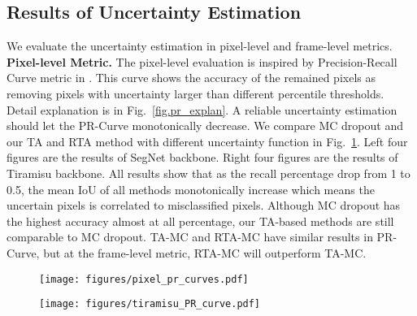 \subsection{Results of Uncertainty Estimation}



We evaluate the uncertainty estimation in pixel-level and frame-level metrics.\\
\noindent\textbf{Pixel-level Metric.}  The pixel-level evaluation is inspired by Precision-Recall Curve metric in \cite{kendall2017uncertainties}. This curve shows the accuracy of the remained pixels as removing pixels with uncertainty larger than different percentile thresholds. Detail explanation is in Fig.~\ref{fig.pr_explan}. A reliable uncertainty estimation should let the PR-Curve monotonically decrease. We compare MC dropout and our TA and RTA method with different uncertainty function in Fig.~\ref{fig.pr_curve}. Left four figures are the results of SegNet backbone. Right four figures are the results of Tiramisu backbone. All results show that as the recall percentage drop from 1 to 0.5, the mean IoU of all methods monotonically increase which means the uncertain pixels is correlated to misclassified pixels. Although MC dropout has the highest accuracy almost at all percentage, our TA-based methods are still comparable to MC dropout. TA-MC and RTA-MC have similar results in PR-Curve, but at the frame-level metric, RTA-MC will outperform TA-MC.\\






\begin{figure}[t]
\centering
\setlength\belowcaptionskip{-20pt}
\begin{minipage}{.5\textwidth}
  \centering
  \texttt{[image: figures/pixel\_pr\_curves.pdf]}
\end{minipage}\begin{minipage}{.5\textwidth}
  \centering
  \texttt{[image: figures/tiramisu\_PR\_curve.pdf]}
\end{minipage}
\small \caption{\small {}}
\label{fig.pr_curve}
\end{figure}






